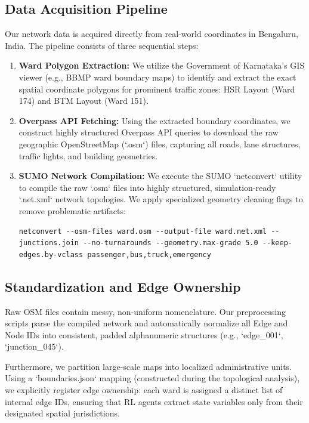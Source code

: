 \documentclass[conference]{IEEEtran}
\begin{document}
\subsection{Data Acquisition Pipeline}
Our network data is acquired directly from real-world coordinates in Bengaluru, India. The pipeline consists of three sequential steps:
\begin{enumerate}
    \item \textbf{Ward Polygon Extraction:} We utilize the Government of Karnataka's GIS viewer (e.g., BBMP ward boundary maps) to identify and extract the exact spatial coordinate polygons for prominent traffic zones: HSR Layout (Ward 174) and BTM Layout (Ward 151).
    \item \textbf{Overpass API Fetching:} Using the extracted boundary coordinates, we construct highly structured Overpass API queries to download the raw geographic OpenStreetMap (`.osm`) files, capturing all roads, lane structures, traffic lights, and building geometries.
    \item \textbf{SUMO Network Compilation:} We execute the SUMO `netconvert` utility to compile the raw `.osm` files into highly structured, simulation-ready `.net.xml` network topologies. We apply specialized geometry cleaning flags to remove problematic artifacts:
    \begin{lstlisting}[basicstyle=\ttfamily\footnotesize, frame=single, breaklines=true]
netconvert --osm-files ward.osm --output-file ward.net.xml --junctions.join --no-turnarounds --geometry.max-grade 5.0 --keep-edges.by-vclass passenger,bus,truck,emergency
    \end{lstlisting}
\end{enumerate}

\subsection{Standardization and Edge Ownership}
Raw OSM files contain messy, non-uniform nomenclature. Our preprocessing scripts parse the compiled network and automatically normalize all Edge and Node IDs into consistent, padded alphanumeric structures (e.g., `edge_001`, `junction_045`). 

Furthermore, we partition large-scale maps into localized administrative units. Using a `boundaries.json` mapping (constructed during the topological analysis), we explicitly register edge ownership: each ward is assigned a distinct list of internal edge IDs, ensuring that RL agents extract state variables only from their designated spatial jurisdictions.
\end{document}
